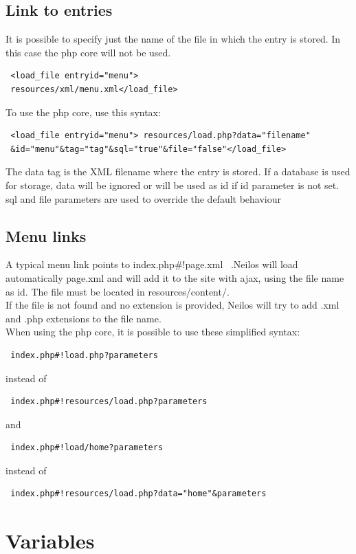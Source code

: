 \documentclass[a4paper,12pt]{article}
\begin{document}
\subsection{Link to entries}
It is possible to specify just the name of the file in which the entry is stored. In this case the php core will not be used. 
\begin{verbatim}
 <load_file entryid="menu">
 resources/xml/menu.xml</load_file>
\end{verbatim}
To use the php core, use this syntax:
\begin{verbatim}
 <load_file entryid="menu"> resources/load.php?data="filename"
 &id="menu"&tag="tag"&sql="true"&file="false"</load_file>
\end{verbatim}
The data tag is the XML filename where the entry is stored. If a database is used for storage, data will be ignored or will be used as id if id parameter is not set.\\
sql and file parameters are used to override the default behaviour
\subsection{Menu links}
A typical menu link points to index.php\#!page.xml \ .Neilos will load automatically page.xml and will add it to the site with ajax, using the file name as id. The file must be located in resources/content/.\\
If the file is not found and no extension is provided, Neilos will try to add .xml and .php extensions to the file name.\\
When using the php core, it is possible to use these simplified syntax:
\begin{verbatim}
 index.php#!load.php?parameters
\end{verbatim}
instead of 
\begin{verbatim}
 index.php#!resources/load.php?parameters
\end{verbatim}
and
\begin{verbatim}
 index.php#!load/home?parameters
\end{verbatim}
instead of
\begin{verbatim}
 index.php#!resources/load.php?data="home"&parameters
\end{verbatim}



\section{Variables}
\end{document}
